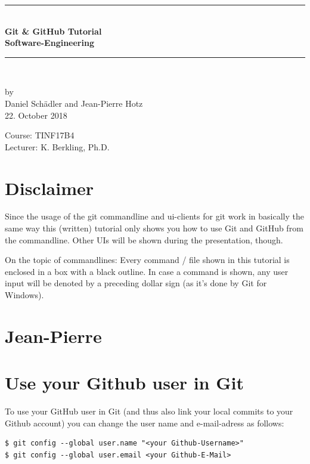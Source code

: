 \documentclass[a4paper, 12pt]{article}
\begin{document}
	
	
	\begin{center}
		\newcommand{\HRule}{\rule{\linewidth}{0.5mm}}
		\HRule \\[0.8cm]
		{ \huge \bfseries Git \& GitHub Tutorial}\\[0.4cm]
		{\LARGE \bfseries Software-Engineering}\\[0.4cm]
		\HRule \\[1.5cm]
		\begin{center}
			by\\[0.2cm]
			Daniel Schädler and Jean-Pierre Hotz\\[0.7cm]
			22. October 2018
		\end{center}
		\vfill
		Course: TINF17B4\\
		Lecturer: K. Berkling, Ph.D.
	\end{center}
	\newpage
	\pagestyle{fancy}

	\section*{Disclaimer}
		
		Since the usage of the git commandline and ui-clients for git work in basically the same way this (written) tutorial only shows you how to use Git and GitHub from the commandline. Other UIs will be shown during the presentation, though.
		
		On the topic of commandlines: Every command / file shown in this tutorial is enclosed in a box with a black outline. In case a command is shown, any user input will be denoted by a preceding dollar sign (as it's done by Git for Windows).

	\section{Jean-Pierre}
		
	\section{Use your Github user in Git}
	
		To use your GitHub user in Git (and thus also link your local commits to your Github account) you can change the user name and e-mail-adress as follows:
		
		\begin{lstlisting}
$ git config --global user.name "<your Github-Username>"
$ git config --global user.email <your Github-E-Mail>
		\end{lstlisting}
		
\end{document}
